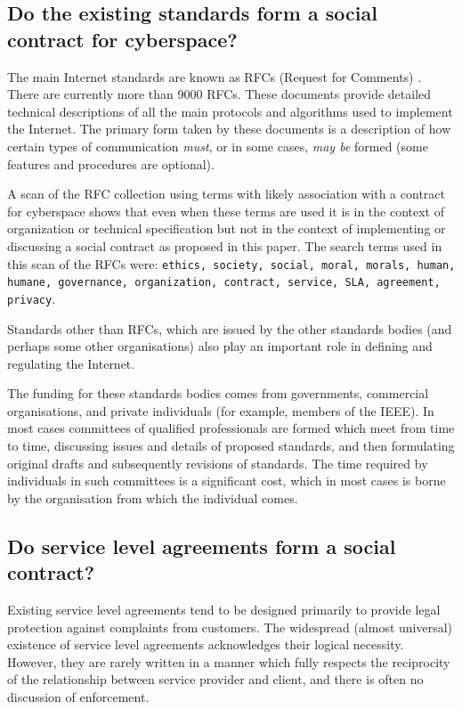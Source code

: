 \subsection{Do the existing standards form a social contract for cyberspace?}

The main Internet standards are known as RFCs (Request for Comments) \cite{RFCs}.
There are currently more than 9000 RFCs. These documents provide detailed
technical descriptions of all the main protocols and algorithms used to
implement the Internet. The primary form taken by these documents is a description
of how certain types of communication {\em must}, or in some cases, {\em may be} 
formed (some features and procedures are optional).

A scan of the RFC collection using terms with likely association with a
contract for cyberspace shows that even when these terms are used it
is in the context of organization or technical specification but not
in the context of implementing or discussing a social contract as proposed in this 
paper. The search terms used in this scan of the RFCs were: {\tt ethics,
society, social, moral, morals, human, humane, governance, organization,
contract, service, SLA, agreement, privacy}.

Standards other than RFCs, which are issued by the other standards bodies \cite{ITU,IEEE,ETSI,ISO}
(and perhaps some other organisations) also play an important role in defining and
regulating the Internet.

The funding for these standards bodies comes from governments, commercial organisations,
and private individuals (for example, members of the IEEE). In most cases committees of
qualified professionals are formed which meet from time to time, discussing
issues and details of proposed standards, and then formulating original drafts and 
subsequently revisions of standards. The time required by individuals in such committees 
is a significant cost, which in most cases is borne by the organisation from which
the individual comes.

\subsection{Do service level agreements form a social contract?}\label{slasec}

Existing service level agreements tend to be designed primarily
to provide legal protection against complaints from customers. The widespread (almost
universal) existence of service level agreements acknowledges their logical
necessity. However, they are rarely written in a manner which fully respects
the reciprocity of the relationship between service provider and client, 
and there is often no discussion of enforcement.



